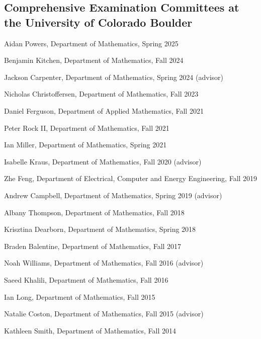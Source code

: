 \documentclass[letterpaper]{article}
\renewenvironment{itemize}{
  \begin{list}{}{
    \setlength{\leftmargin}{1em}
  }
}{
  \end{list}
}
\begin{document}
\subsection*{Comprehensive Examination Committees at the University of Colorado Boulder} 
\begin{itemize}
	\item Aidan Powers, Department of Mathematics, Spring 2025
	\item Benjamin Kitchen, Department of Mathematics, Fall 2024
	\item Jackson Carpenter, Department of Mathematics, Spring 2024 (advisor)
	\item Nicholas Christoffersen, Department of Mathematics, Fall 2023
	\item Daniel Ferguson, Department of Applied Mathematics, Fall 2021
	\item Peter Rock II, Department of Mathematics, Fall 2021
	\item Ian Miller, Department of Mathematics, Spring 2021
	\item Isabelle Kraus, Department of Mathematics, Fall 2020 (advisor)
	\item Zhe Feng, Department of Electrical, Computer and Energy Engineering, Fall 2019  
	\item Andrew Campbell, Department of Mathematics, Spring 2019 (advisor) 
	\item Albany Thompson, Department of Mathematics, Fall 2018 
	\item Krisztina Dearborn, Department of Mathematics, Spring 2018 
	\item Braden Balentine, Department of Mathematics, Fall 2017 
	\item Noah Williams, Department of Mathematics, Fall 2016 (advisor) 
	\item Saeed Khalili, Department of Mathematics, Fall 2016 
	\item Ian Long, Department of Mathematics, Fall 2015 
	\item Natalie Coston, Department of Mathematics, Fall 2015 (advisor)
	\item Kathleen Smith, Department of Mathematics, Fall 2014

\end{itemize}
\end{document}
